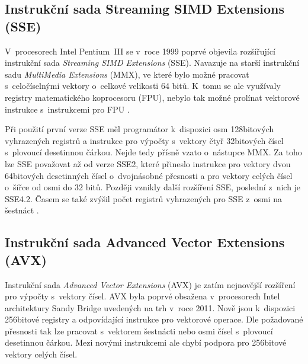 \subsection{Instrukční sada Streaming SIMD Extensions (SSE)}

V~procesorech Intel Pentium~III se v~roce 1999 poprvé objevila rozšířující instrukční sada \emph{Streaming SIMD Extensions} (SSE). Navazuje na starší instrukční sadu \emph{MultiMedia Extensions} (MMX), ve které bylo možné pracovat s~celočíselnými vektory o~celkové velikosti 64 bitů. K~tomu se ale využívaly registry matematického koprocesoru (FPU), nebylo tak možné prolínat vektorové instrukce s~instrukcemi pro FPU \cite{IntelMMX}.

Při použití první verze SSE měl programátor k~dispozici osm 128bitových vyhrazených registrů a instrukce pro výpočty s~vektory čtyř 32bitových čísel s~plovoucí desetinnou čárkou. Nejde tedy přísně vzato o~nástupce MMX. Za toho lze SSE považovat až od verze SSE2, které přineslo instrukce pro vektory dvou 64bitových desetinných čísel o~dvojnásobné přesnosti a pro vektory celých čísel o~šířce od osmi do 32 bitů. Později vznikly další rozšíření SSE, poslední z~nich je SSE4.2. Časem se také zvýšil počet registrů vyhrazených pro SSE z~osmi na šestnáct \cite{IntelSSEDefine, IntelSSE}.






\subsection{Instrukční sada Advanced Vector Extensions (AVX)}


Instrukční sada \emph{Advanced Vector Extensions} (AVX) je zatím nejnovější rozšíření pro výpočty s~vektory čísel. AVX byla poprvé obsažena v~procesorech Intel architektury Sandy Bridge uvedených na trh v~roce 2011. Nově jsou k~dispozici 256bitové registry a odpovídající instrukce pro vektorové operace. Dle požadované přesnosti tak lze pracovat s~vektorem šestnácti nebo osmi čísel s~plovoucí desetinnou čárkou. Mezi novými instrukcemi ale chybí podpora pro 256bitové vektory celých čísel.

